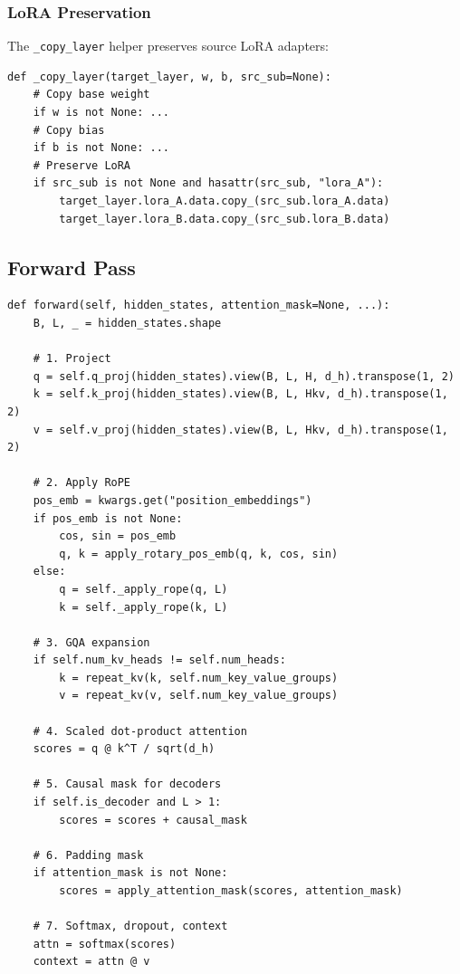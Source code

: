 {\subsubsection{LoRA Preservation}

The \texttt{\_copy\_layer} helper preserves source LoRA adapters:

\begin{lstlisting}
def _copy_layer(target_layer, w, b, src_sub=None):
    # Copy base weight
    if w is not None: ...
    # Copy bias
    if b is not None: ...
    # Preserve LoRA
    if src_sub is not None and hasattr(src_sub, "lora_A"):
        target_layer.lora_A.data.copy_(src_sub.lora_A.data)
        target_layer.lora_B.data.copy_(src_sub.lora_B.data)
\end{lstlisting}

\subsection{Forward Pass}

\begin{lstlisting}
def forward(self, hidden_states, attention_mask=None, ...):
    B, L, _ = hidden_states.shape
    
    # 1. Project
    q = self.q_proj(hidden_states).view(B, L, H, d_h).transpose(1, 2)
    k = self.k_proj(hidden_states).view(B, L, Hkv, d_h).transpose(1, 2)
    v = self.v_proj(hidden_states).view(B, L, Hkv, d_h).transpose(1, 2)
    
    # 2. Apply RoPE
    pos_emb = kwargs.get("position_embeddings")
    if pos_emb is not None:
        cos, sin = pos_emb
        q, k = apply_rotary_pos_emb(q, k, cos, sin)
    else:
        q = self._apply_rope(q, L)
        k = self._apply_rope(k, L)
    
    # 3. GQA expansion
    if self.num_kv_heads != self.num_heads:
        k = repeat_kv(k, self.num_key_value_groups)
        v = repeat_kv(v, self.num_key_value_groups)
    
    # 4. Scaled dot-product attention
    scores = q @ k^T / sqrt(d_h)
    
    # 5. Causal mask for decoders
    if self.is_decoder and L > 1:
        scores = scores + causal_mask
    
    # 6. Padding mask
    if attention_mask is not None:
        scores = apply_attention_mask(scores, attention_mask)
    
    # 7. Softmax, dropout, context
    attn = softmax(scores)
    context = attn @ v
    

\end{lstlisting}}
